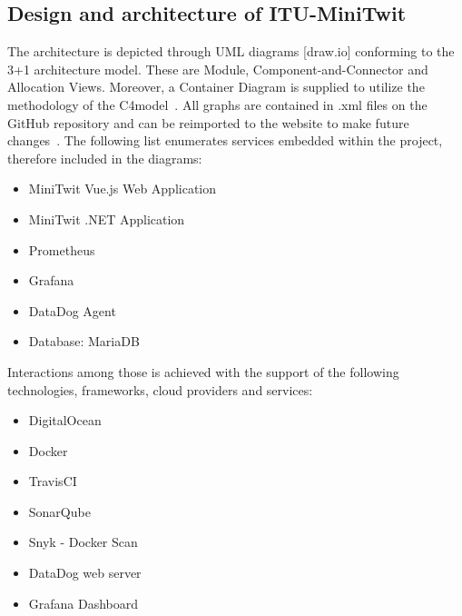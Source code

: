 \subsection{Design and architecture of ITU-MiniTwit}

The architecture is depicted through UML diagrams [draw.io] conforming to the 3+1 architecture model. These are Module, Component-and-Connector and Allocation Views. Moreover, a Container Diagram is supplied to utilize the methodology of the C4model~\cite{c4model}. All graphs are contained in .xml files on the GitHub repository and can be reimported to the website to make future changes~\cite{architecturalViews}. The following list enumerates services embedded within the project, therefore included in the diagrams:

\begin{itemize}[noitemsep]
    \item MiniTwit Vue.js Web Application
    \item MiniTwit .NET Application
    \item Prometheus
    \item Grafana
    \item DataDog Agent
    \item Database: MariaDB
\end{itemize}

\vspace{3mm}

Interactions among those is achieved with the support of the following technologies, frameworks, cloud providers and services:

\begin{itemize}[noitemsep]
    \item DigitalOcean
    \item Docker
    \item TravisCI
    \item SonarQube
    \item Snyk - Docker Scan
    \item DataDog web server
    \item Grafana Dashboard
\end{itemize}







